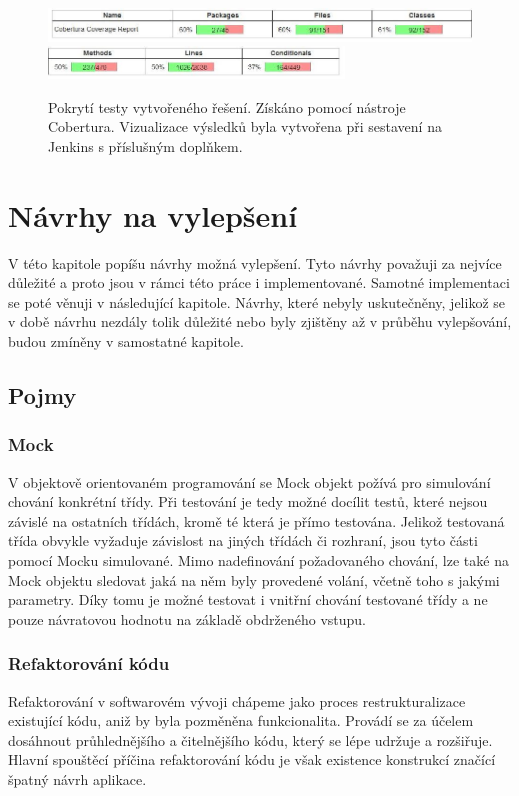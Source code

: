 \documentclass[thesis=B,czech]{FITthesis}[2012/06/26]
\begin{document}
\begin{figure}[h]\centering
 	\includegraphics[width=1.0\textwidth]{resources/cobertura-report-old-1}
 	\includegraphics[width=0.7\textwidth]{resources/cobertura-report-old-2}
	\caption[Pokrytí testy vytvořeného řešení]{Pokrytí testy vytvořeného řešení. Získáno pomocí nástroje Cobertura. Vizualizace
	výsledků byla vytvořena při sestavení na Jenkins s příslušným doplňkem.}\label{fig:dp-dia}
\end{figure}


\chapter{Návrhy na vylepšení}
V této kapitole popíšu návrhy možná vylepšení. Tyto návrhy považuji za nejvíce důležité a proto jsou
v rámci této práce i implementované. Samotné implementaci se poté věnuji v následující kapitole. 
Návrhy, které nebyly uskutečněny, jelikož se v době návrhu nezdály tolik důležité nebo byly zjištěny až v průběhu 
vylepšování, budou zmíněny v samostatné kapitole.

\section{Pojmy}

\subsection{Mock}
V objektově orientovaném programování se Mock objekt požívá pro simulování chování konkrétní třídy.\cite{mock}
Při testování je tedy možné docílit testů, které nejsou závislé na ostatních třídách, kromě té která je přímo testována.
Jelikož testovaná třída obvykle vyžaduje závislost na jiných třídách či rozhraní, jsou tyto části pomocí Mocku simulované.
Mimo nadefinování požadovaného chování, lze také na Mock objektu sledovat jaká na něm byly provedené volání, včetně toho
s jakými parametry. Díky tomu je možné testovat i vnitřní chování testované třídy a ne pouze návratovou hodnotu na základě 
obdrženého vstupu.

\subsection{Refaktorování kódu}
Refaktorování v softwarovém vývoji chápeme jako proces restrukturalizace existující kódu, aniž by byla 
pozměněna funkcionalita. Provádí se za účelem dosáhnout průhlednějšího a čitelnějšího kódu, který
se lépe udržuje a rozšiřuje. \cite{refaktoring} Hlavní spouštěcí příčina refaktorování kódu je však existence 
konstrukcí značící špatný návrh aplikace. 
\end{document}

